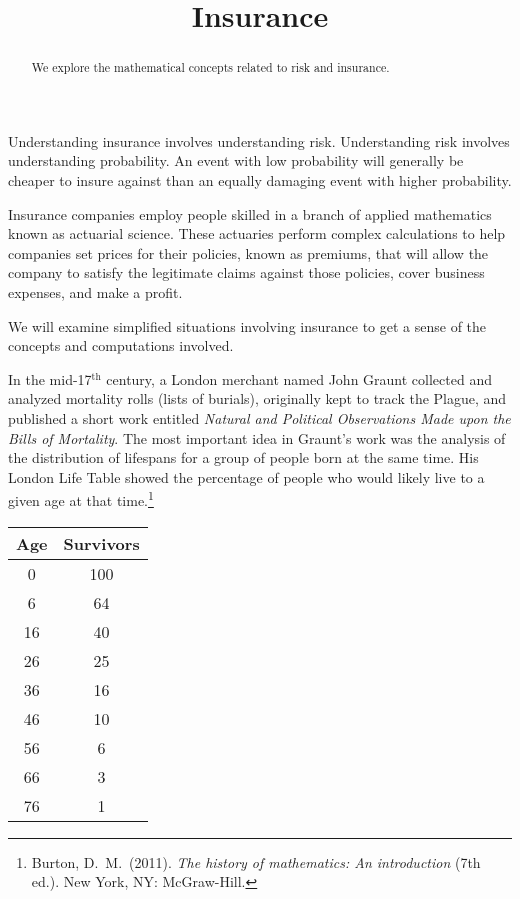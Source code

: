 \documentclass{ximera}
\title{Insurance}
\begin{document}
\begin{abstract}
We explore the mathematical concepts related to risk and insurance.
\end{abstract}

\maketitle

Understanding insurance involves understanding risk. Understanding risk involves understanding probability. An event with low probability will generally be cheaper to insure against than an equally damaging event with higher probability.

Insurance companies employ people skilled in a branch of applied mathematics known as actuarial science. These actuaries perform complex calculations to help companies set prices for their policies, known as premiums, that will allow the company to satisfy the legitimate claims against those policies, cover business expenses, and make a profit.

We will examine simplified situations involving insurance to get a sense of the concepts and computations involved.

In the mid-17$^\text{th}$ century, a London merchant named John Graunt collected and analyzed mortality rolls (lists of burials), originally kept to track the Plague, and published a short work entitled \textit{Natural and Political Observations Made upon the Bills of Mortality}. The most important idea in Graunt's work was the analysis of the distribution of lifespans for a group of people born at the same time. His London Life Table showed the percentage of people who would likely live to a given age at that time.\footnote{Burton, D.\ M.\ (2011). \textit{The history of mathematics: An introduction} (7th ed.). New York, NY: McGraw-Hill.}
\begin{center}
\begin{tabular}{@{}cc@{}}\toprule
\textbf{Age} & \textbf{Survivors}\\\midrule
0 & 100\\
6 & 64\\
16 & 40\\
26 & 25\\
36 & 16\\
46 & 10\\
56 & 6\\
66 & 3\\
76 & 1\\\bottomrule
\end{tabular}
\end{center}
\end{document}
